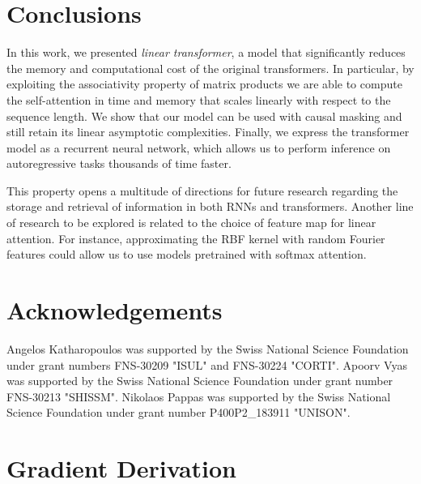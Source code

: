 \documentclass{article}
\newcommand{\linear}{\emph{linear transformer}}
\begin{document}
\section{Conclusions}

In this work, we presented \linear{}, a model that significantly
reduces the memory and computational cost of the original transformers. In
particular, by exploiting the associativity property of matrix products we are
able to compute the self-attention in time and memory that scales linearly with
respect to the sequence length. We show that our model can be used with causal
masking and still retain its linear asymptotic complexities. Finally, we
express the transformer model as a recurrent neural network, which allows us to
perform inference on autoregressive tasks thousands of time faster.

This property opens a multitude of directions for future research regarding the
storage and retrieval of information in both RNNs and transformers. Another
line of research to be explored is related to the choice of feature map for
linear attention. For instance, approximating the RBF kernel with random
Fourier features could allow us to use models pretrained with softmax
attention.

\section*{Acknowledgements}

Angelos Katharopoulos was supported by the Swiss National Science Foundation
under grant numbers FNS-30209 "ISUL" and FNS-30224 "CORTI". Apoorv Vyas was
supported by the Swiss National Science Foundation under grant number FNS-30213
"SHISSM". Nikolaos Pappas was supported by the Swiss National Science
Foundation under grant number P400P2\_183911 "UNISON".





\appendix
\onecolumn
{}
\section{Gradient Derivation}
\end{document}
